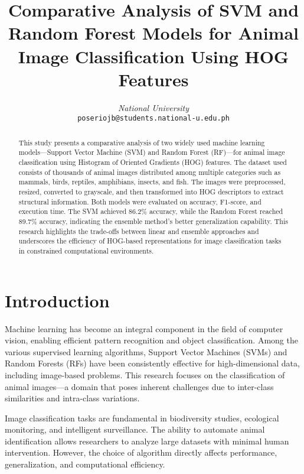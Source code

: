 \documentclass[conference]{IEEEtran}
\begin{document}
\title{Comparative Analysis of SVM and Random Forest Models for Animal Image Classification Using HOG Features}

\author{
\textit{National University} \\
\texttt{poseriojb@students.national-u.edu.ph}}


\maketitle

\begin{abstract}
This study presents a comparative analysis of two widely used machine learning models—Support Vector Machine (SVM) and Random Forest (RF)—for animal image classification using Histogram of Oriented Gradients (HOG) features. The dataset used consists of thousands of animal images distributed among multiple categories such as mammals, birds, reptiles, amphibians, insects, and fish. The images were preprocessed, resized, converted to grayscale, and then transformed into HOG descriptors to extract structural information. Both models were evaluated on accuracy, F1-score, and execution time. The SVM achieved 86.2\% accuracy, while the Random Forest reached 89.7\% accuracy, indicating the ensemble method’s better generalization capability. This research highlights the trade-offs between linear and ensemble approaches and underscores the efficiency of HOG-based representations for image classification tasks in constrained computational environments.
\end{abstract}

\section{Introduction}
Machine learning has become an integral component in the field of computer vision, enabling efficient pattern recognition and object classification. Among the various supervised learning algorithms, Support Vector Machines (SVMs) and Random Forests (RFs) have been consistently effective for high-dimensional data, including image-based problems. This research focuses on the classification of animal images—a domain that poses inherent challenges due to inter-class similarities and intra-class variations.  
\vspace{3pt}

Image classification tasks are fundamental in biodiversity studies, ecological monitoring, and intelligent surveillance. The ability to automate animal identification allows researchers to analyze large datasets with minimal human intervention. However, the choice of algorithm directly affects performance, generalization, and computational efficiency.  
\vspace{3pt}
\end{document}
